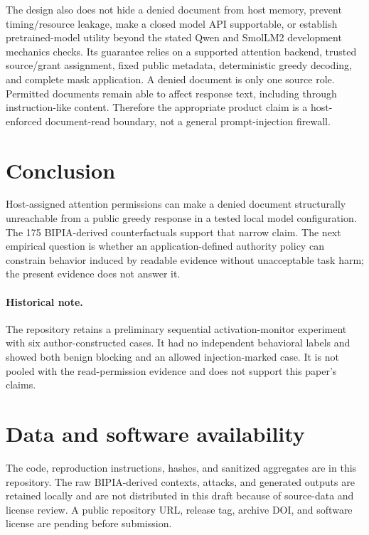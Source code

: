 \documentclass[11pt]{article}
\begin{document}
The design also does not hide a denied document from host memory, prevent timing/resource leakage, make a closed model API supportable, or establish pretrained-model utility beyond the stated Qwen and SmolLM2 development mechanics checks. Its guarantee relies on a supported attention backend, trusted source/grant assignment, fixed public metadata, deterministic greedy decoding, and complete mask application. A denied document is only one source role. Permitted documents remain able to affect response text, including through instruction-like content. Therefore the appropriate product claim is a host-enforced document-read boundary, not a general prompt-injection firewall.

\section{Conclusion}

Host-assigned attention permissions can make a denied document structurally unreachable from a public greedy response in a tested local model configuration. The 175 BIPIA-derived counterfactuals support that narrow claim. The next empirical question is whether an application-defined authority policy can constrain behavior induced by readable evidence without unacceptable task harm; the present evidence does not answer it.

\paragraph{Historical note.} The repository retains a preliminary sequential activation-monitor experiment with six author-constructed cases. It had no independent behavioral labels and showed both benign blocking and an allowed injection-marked case. It is not pooled with the read-permission evidence and does not support this paper's claims.

\section*{Data and software availability}

The code, reproduction instructions, hashes, and sanitized aggregates are in this repository. The raw BIPIA-derived contexts, attacks, and generated outputs are retained locally and are not distributed in this draft because of source-data and license review. A public repository URL, release tag, archive DOI, and software license are pending before submission.
\end{document}
